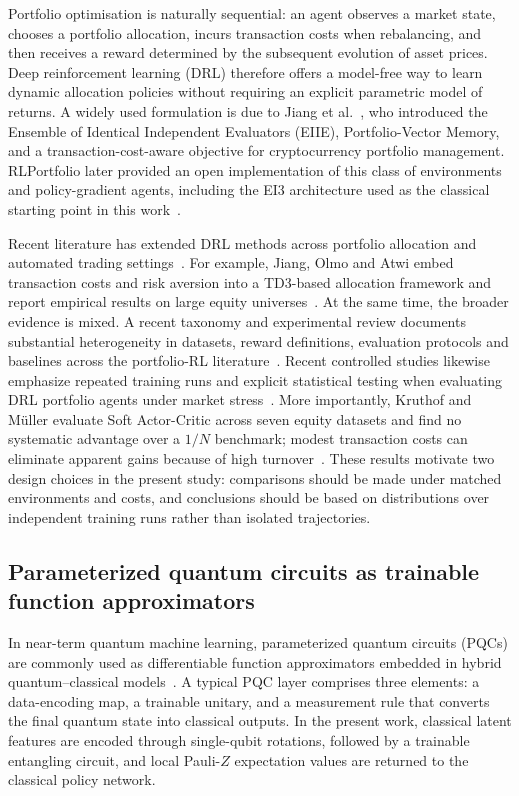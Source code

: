 \documentclass[aps,floatfix,superscriptaddress,twocolumn,tightenlines,amsmath,amssymb,nofootinbib,10pt,longbibliography,prl]{revtex4-2}
\begin{document}
Portfolio optimisation is naturally sequential: an agent observes a market state, chooses a portfolio allocation, incurs transaction costs when rebalancing, and then receives a reward determined by the subsequent evolution of asset prices. Deep reinforcement learning (DRL) therefore offers a model-free way to learn dynamic allocation policies without requiring an explicit parametric model of returns. A widely used formulation is due to Jiang et al.~\cite{jiang2017deepreinforcementlearningframework}, who introduced the Ensemble of Identical Independent Evaluators (EIIE), Portfolio-Vector Memory, and a transaction-cost-aware objective for cryptocurrency portfolio management. RLPortfolio later provided an open implementation of this class of environments and policy-gradient agents, including the EI3 architecture used as the classical starting point in this work~\cite{RLportfolio}.

Recent literature has extended DRL methods across portfolio allocation and automated trading settings~\cite{Yang2020EnsembleTrading}. For example, Jiang, Olmo and Atwi embed transaction costs and risk aversion into a TD3-based allocation framework and report empirical results on large equity universes~\cite{Jiang2024DRLPortfolioSelection}. At the same time, the broader evidence is mixed. A recent taxonomy and experimental review documents substantial heterogeneity in datasets, reward definitions, evaluation protocols and baselines across the portfolio-RL literature~\cite{Rezaei2025DRLPortfolioReview}. Recent controlled studies likewise emphasize repeated training runs and explicit statistical testing when evaluating DRL portfolio agents under market stress~\cite{Ayari2026FeatureConfigDRL}. More importantly, Kruthof and M\"uller evaluate Soft Actor-Critic across seven equity datasets and find no systematic advantage over a $1/N$ benchmark; modest transaction costs can eliminate apparent gains because of high turnover~\cite{Kruthof2025CanDRLBeat1N}. These results motivate two design choices in the present study: comparisons should be made under matched environments and costs, and conclusions should be based on distributions over independent training runs rather than isolated trajectories.

\subsection{Parameterized quantum circuits as trainable function approximators}
\label{subsec:bg-pqc}

In near-term quantum machine learning, parameterized quantum circuits (PQCs) are commonly used as differentiable function approximators embedded in hybrid quantum--classical models~\cite{Benedetti2019Parameterizedquant,Cerezo2021Variationalquantum}. A typical PQC layer comprises three elements: a data-encoding map, a trainable unitary, and a measurement rule that converts the final quantum state into classical outputs. In the present work, classical latent features are encoded through single-qubit rotations, followed by a trainable entangling circuit, and local Pauli-$Z$ expectation values are returned to the classical policy network.
\end{document}
